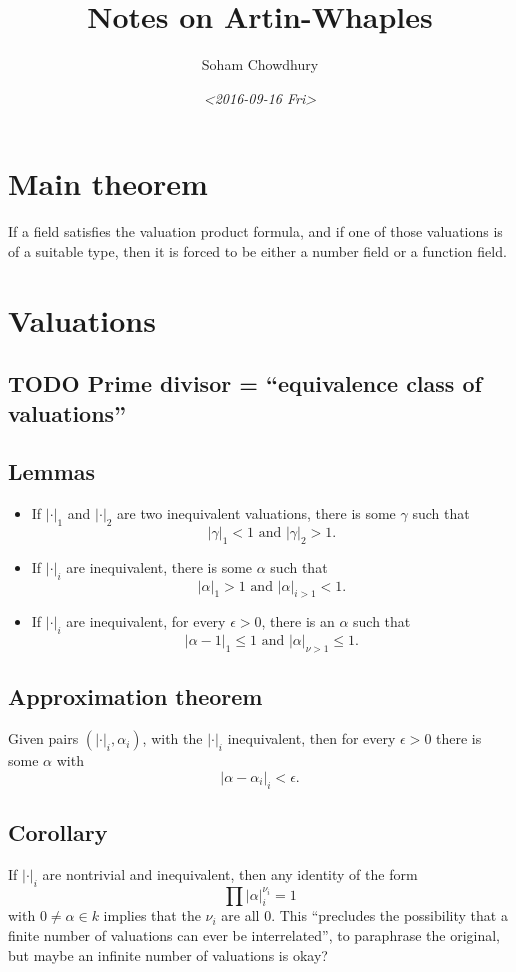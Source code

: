 \documentclass{article}
\author{Soham Chowdhury}
\date{\textit{<2016-09-16 Fri>}}
\title{Notes on Artin-Whaples}
\begin{document}
\maketitle
\tableofcontents


\section{Main theorem}
\label{sec:orgheadline1}
If a field satisfies the valuation product formula, and if one of those valuations is of a suitable type, then it is forced to be either a number field or a function field.

\section{Valuations}
\label{sec:orgheadline6}
\subsection{{\bfseries\sffamily TODO} Prime divisor = ``equivalence class of valuations''}
\label{sec:orgheadline2}
\subsection{Lemmas}
\label{sec:orgheadline3}
\begin{itemize}
\item If \(|\cdot|_1\) and \(|\cdot|_2\) are two inequivalent valuations, there is some \(\gamma\) such that \[|\gamma|_1 < 1 \text{ and } |\gamma|_2 > 1.\]
\item If \(|\cdot|_i\) are inequivalent, there is some \(\alpha\) such that \[|\alpha|_1 > 1\text{ and }|\alpha|_{i>1} < 1.\]
\item If \(|\cdot|_i\) are inequivalent, for every \(\epsilon>0\), there is an \(\alpha\) such that \[|\alpha-1|_1 \leq 1 \text{ and } |\alpha|_{\nu>1}\leq 1.\]
\end{itemize}
\subsection{Approximation theorem}
\label{sec:orgheadline4}
Given pairs \((|\cdot|_i, \alpha_i)\), with the \(|\cdot|_i\) inequivalent, then for every \(\epsilon>0\) there is some \(\alpha\) with 
\[|\alpha - \alpha_i|_i < \epsilon.\]
\subsection{Corollary}
\label{sec:orgheadline5}
If \(|\cdot|_i\) are nontrivial and inequivalent, then any identity of the form
\[\prod |\alpha|_{i}^{\nu_i} = 1\]
with \(0\neq \alpha\in k\) implies that the \(\nu_i\) are all \(0\).
This ``precludes the possibility that a finite number of valuations can ever be interrelated'', to paraphrase the original, but maybe an infinite number of valuations is okay?
\end{document}
